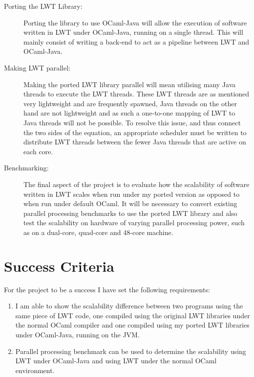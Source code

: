 \documentclass[a4paper]{article}
\begin{document}
\begin{description}
\item[Porting the LWT Library:] Porting the library to use OCaml-Java will allow the execution of software written in LWT under OCaml-Java, running on a single thread. This will mainly consist of writing a back-end to act as a pipeline between LWT and OCaml-Java. 

\item[Making LWT parallel:] Making the ported LWT library parallel will mean utilising many Java threads to execute the LWT threads. These LWT threads are as mentioned very lightweight and are frequently spawned, Java threads on the other hand are not lightweight and as such a one-to-one mapping of LWT to Java threads will not be possible. To resolve this issue, and thus connect the two sides of the equation, an appropriate scheduler must be written to distribute LWT threads between the fewer Java threads that are active on each core.

\item[Benchmarking:] The final aspect of the project is to evaluate how the scalability of software written in LWT scales when run under my ported version as opposed to when run under default OCaml. It will be necessary to convert existing parallel processing benchmarks to use the ported LWT library and also test the scalability on hardware of varying parallel processing power, such as on a dual-core, quad-core and 48-core machine.
\end{description}

\section{Success Criteria}
\label{sec:success}
For the project to be a success I have set the following requirements:
\begin{enumerate}

\item{I am able to show the scalability difference between two programs using the same piece of LWT code, one compiled using the original LWT libraries under the normal OCaml compiler and one compiled using my ported LWT libraries under OCaml-Java, running on the JVM.}
\item{Parallel processing benchmark can be used to determine the scalability using LWT under OCaml-Java and using LWT under the normal OCaml environment.}
\end{enumerate}
\end{document}
